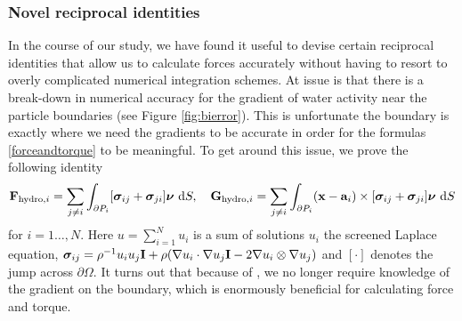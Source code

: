 \subsubsection{Novel reciprocal identities}
In the course of our study, we have found it useful to devise certain reciprocal identities that
allow us to calculate forces accurately without having to resort to overly complicated numerical integration schemes. 
At issue is that there is a break-down in numerical accuracy for the gradient of water activity near the particle
boundaries (see Figure \ref{fig:bierror}).
This is unfortunate the boundary is exactly where we need the gradients to be accurate in order for the formulas \eqref{forceandtorque}
to be meaningful. To get around this issue, we prove the following identity
  \begin{equation}
    \label{eq:reciprocal}
{\bf F}_{\text{hydro},i} = \sum_{j \neq i} \int_{\partial P_i}[\boldsymbol{\sigma}_{ij} + \boldsymbol{\sigma}_{ji}]\boldsymbol{\nu}\,\dif S,\quad
{\bf G}_{\text{hydro},i} = \sum_{j \neq i} \int_{\partial P_i} ({\bf x}-\mathbf{a}_i) \times [\boldsymbol{\sigma}_{ij} + \boldsymbol{\sigma}_{ji}]\boldsymbol{\nu}\,\dif S
  \end{equation}
for $i = 1\dots, N$. Here $u = \sum_{i=1}^N u_i$ is a sum of solutions $u_i$ the screened Laplace equation,
$\boldsymbol{\sigma}_{ij} = \rho^{-1} u_iu_j {\bf I} + \rho(\nabla u_i \cdot \nabla u_j {\bf I} - 2 \nabla u_i \otimes \nabla u_j)$ and
$[\cdot]$ denotes the jump across $\partial \Omega.$  It turns out that because of \cite{eq:reciprocal},
we no longer require knowledge of the gradient on the boundary, which is enormously beneficial for calculating force and torque.




